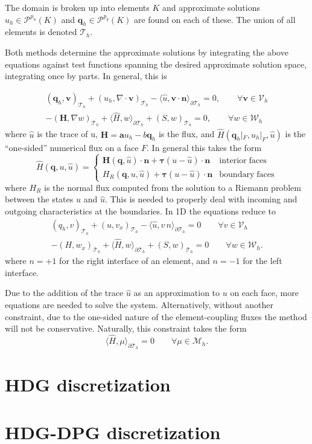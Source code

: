 \documentclass[12pt,letter]{article}
\newcommand{\sbf}[1]{\boldsymbol{#1}}
\newcommand{\mbf}[1]{\mathbf{#1}}
\newcommand{\mcal}[1]{\mathcal{#1}}
\newcommand{\mth}{{\mcal{T}_h}}
\newcommand{\dmth}{{\partial\mcal{T}_h}}
\begin{document}
The domain is broken up into elements $K$ and approximate solutions
$u_h \in \mcal{P}^{p_u}(K)$ and $\mbf{q}_h \in \mcal{P}^{p_q}(K)$ are found
on each of these.  The union of all elements is denoted $\mcal{T}_h$.

Both methods determine the approximate solutions by integrating the
above equations against test functions spanning the desired
approximate solution space, integrating once by parts.  In general, this is

\begin{align}
(\mbf{q}_h,\mbf{v})_\mth + (u_h,\nabla \cdot \mbf{v})_\mth - \langle \hat{u}, \mbf{v} \cdot \mbf{n}  \rangle_\dmth = 0,\qquad \forall \mbf{v} \in \sbf{\mcal{V}}_h \\
-(\mbf{H},\nabla w)_\mth + \langle \hat{H}, w \rangle_\dmth + (S,w)_\mth = 0,\qquad \forall w \in \mcal{W}_h 
\end{align}
%
where $\hat{u}$ is the trace of u, $\mbf{H} = \mbf{a} u_h - b \mbf{q}_h$ is the flux, and $\hat{H}(\mbf{q}_h|_F,u_h|_F,\hat{u})$ is the ``one-sided'' numerical flux on a face $F$.  In general this takes the form
%
\begin{equation}
\hat{H}(\mbf{q},u,\hat{u}) = 
\begin{cases}
\mbf{H}(\mbf{q},\hat{u}) \cdot \mbf{n} + \sbf{\tau} (u - \hat{u}) \cdot \mbf{n} & \mathrm{interior\;faces} \\
H_R(\mbf{q},u,\hat{u}) + \sbf{\tau} (u - \hat{u}) \cdot \mbf{n} & \mathrm{boundary\;faces}
\end{cases}
\end{equation}
%
where $H_R$ is the normal flux computed from the solution to a Riemann
problem between the states $u$ and $\hat{u}$.  This is needed to
properly deal with incoming and outgoing characteristics at the
boundaries.  In 1D the equations reduce to
%
\begin{align*}
(q_h,v)_\mth + (u,v_x)_\mth - \langle \hat{u}, v\,n \rangle_\dmth = 0 \qquad \forall v \in \mcal{V}_h \\
-(H,w_x)_\mth + \langle \hat{H}, w \rangle_\dmth + (S,w)_\mth = 0 \qquad \forall w \in \mcal{W}_h.
\end{align*}
%
where $n=+1$ for the right interface of an element, and $n=-1$ for the left interface.

Due to the addition of the trace $\hat{u}$ as an approximation to $u$
on each face, more equations are needed to solve the system.
Alternatively, without another constraint, due to the one-sided nature
of the element-coupling fluxes the method will not be conservative.
Naturally, this constraint takes the form
%
\begin{equation}
\langle \hat{H}, \mu \rangle_\dmth = 0 \qquad \forall \mu \in \mcal{M}_h.
\end{equation}
%

\section{HDG discretization}

\section{HDG-DPG discretization}
\end{document}
